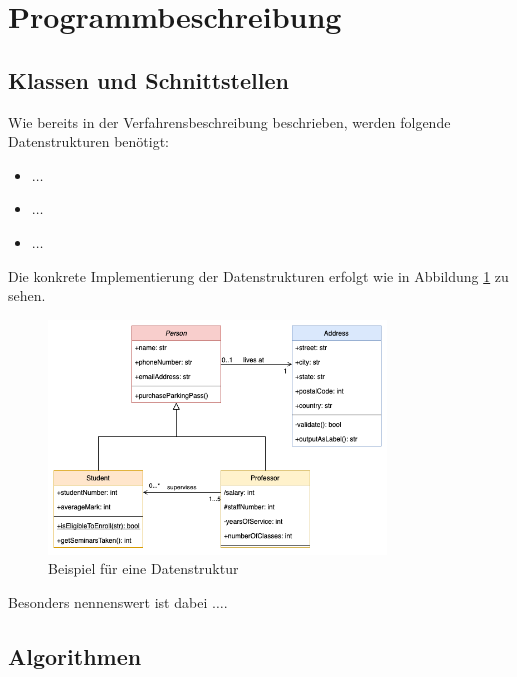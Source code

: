 \section{Programmbeschreibung}
\label{sec:programmbeschreibung}


\subsection{Klassen und Schnittstellen}
\label{ssec:klassen_und_schnittstellen}

Wie bereits in der Verfahrensbeschreibung beschrieben, werden folgende Datenstrukturen benötigt:

\begin{itemize}
    \item $\ldots$
    \item $\ldots$
    \item $\ldots$
\end{itemize}

Die konkrete Implementierung der Datenstrukturen erfolgt wie in Abbildung \ref{fig:example_datastructure} zu sehen.

\begin{figure}[H]
    \centering
    \includegraphics[width=0.8\textwidth]{figures/example_datastructure.png}
    \caption{Beispiel für eine Datenstruktur}
    \label{fig:example_datastructure}
\end{figure}

Besonders nennenswert ist dabei $\ldots$.

\subsection{Algorithmen}
\label{ssec:algorithmen}

